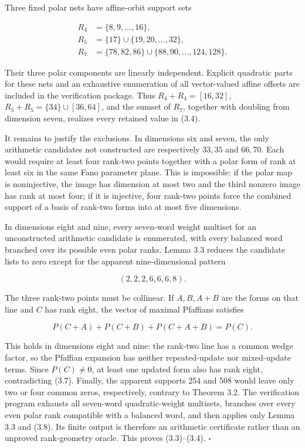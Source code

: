 \documentclass[11pt]{article}
\theoremstyle{remark}
\numberwithin{equation}{section}
\begin{document}
Three fixed polar nets have affine-orbit support sets

\[
\begin{aligned}
R_4&=\{8,9,\ldots,16\},\\
R_5&=\{17\}\cup\{19,20,\ldots,32\},\\
R_7&=\{78,82,86\}\cup\{88,90,\ldots,124,128\}.
\end{aligned}                                                    \tag{3.6}
\]

Their three polar components are linearly independent. Explicit quadratic
parts for these nets and an exhaustive enumeration of all vector-valued affine
offsets are included in the verification package. Thus
\(R_4+R_4=[16,32]\),
\(R_5+R_5=\{34\}\cup[36,64]\), and the sumset of \(R_7\), together with
doubling from dimension seven, realizes every retained value in (3.4).

It remains to justify the exclusions. In dimensions six and seven, the only
arithmetic candidates not constructed are respectively \(33,35\) and
\(66,70\). Each would require at least four rank-two points together with a
polar form of rank at least six in the same Fano parameter plane. This is
impossible: if the polar map is noninjective, the image has dimension at most
two and the third nonzero image has rank at most four; if it is injective, four
rank-two points force the combined support of a basis of rank-two forms into at
most five dimensions.

In dimensions eight and nine, every seven-word weight multiset for an
unconstructed arithmetic candidate is enumerated, with every balanced word
branched over its possible even polar ranks. Lemma 3.3 reduces the
candidate lists to zero except for the apparent nine-dimensional pattern

\[
(2,2,2,6,6,6,8).                                \tag{3.7}
\]

The three rank-two points must be collinear. If \(A,B,A+B\) are the forms on
that line and \(C\) has rank eight, the vector of maximal Pfaffians satisfies

\[
P(C+A)+P(C+B)+P(C+A+B)=P(C).                    \tag{3.8}
\]

This holds in dimensions eight and nine: the rank-two line has a common wedge
factor, so the Pfaffian expansion has neither repeated-update nor mixed-update
terms. Since \(P(C)\ne0\), at least one updated form also has rank eight,
contradicting (3.7). Finally, the apparent supports \(254\) and \(508\) would
leave only two or four common zeros, respectively, contrary to Theorem 3.2.
The verification program exhausts all seven-word quadratic-weight multisets,
branches over every even polar rank compatible with a balanced word, and then
applies only Lemma 3.3 and (3.8). Its finite output is therefore an arithmetic
certificate rather than an unproved rank-geometry oracle. This proves
(3.3)--(3.4).
\hfill$\square$
\end{document}
